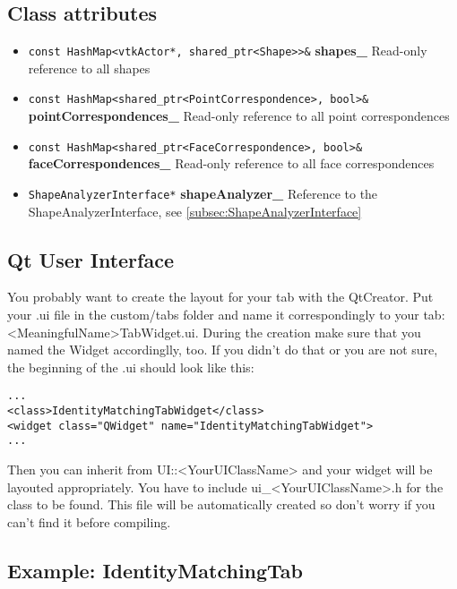 \subsection{Class attributes}
\begin{itemize}
	\item \texttt{const HashMap<vtkActor*, shared\_ptr<Shape>>\&} \textbf{shapes\_} Read-only reference to all shapes
	\item \texttt{const HashMap<shared\_ptr<PointCorrespondence>, bool>\&} \textbf{pointCorrespondences\_} Read-only reference to all point correspondences
	\item \texttt{const HashMap<shared\_ptr<FaceCorrespondence>, bool>\&} \textbf{faceCorrespondences\_} Read-only reference to all face correspondences
	\item \texttt{ShapeAnalyzerInterface*} \textbf{shapeAnalyzer\_} Reference to the ShapeAnalyzerInterface, see \ref{subsec:ShapeAnalyzerInterface}
\end{itemize}

\subsection{Qt User Interface}
\label{subsec:QtUI}

You probably want to create the layout for your tab with the QtCreator. Put your .ui file in the custom/tabs folder and name it correspondingly to your tab: <MeaningfulName>TabWidget.ui. During the creation make sure that you named the Widget accordinglly, too. If you didn't do that or you are not sure, the beginning of the .ui should look like this: 

\begin{lstlisting}[style=lstStyleCpp, caption={IdentityMatchingTabWidget.ui}]
...
<class>IdentityMatchingTabWidget</class>
<widget class="QWidget" name="IdentityMatchingTabWidget">
...
\end{lstlisting}

Then you can inherit from UI::<YourUIClassName> and your widget will be layouted appropriately. You have to include ui\_<YourUIClassName>.h for the class to be found. This file will be automatically created so don't worry if you can't find it before compiling. 


\subsection{Example: IdentityMatchingTab}
\label{subsec:ExampleIdentityMatchingTab}

